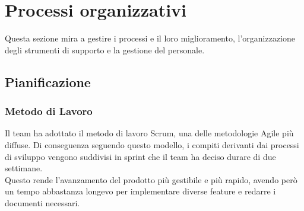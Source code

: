 \section{Processi organizzativi}
Questa sezione mira a gestire i processi e il loro miglioramento, l'organizzazione degli strumenti
di supporto e la gestione del personale.

    \subsection{Pianificazione}
        \subsubsection{Metodo di Lavoro}
        Il team ha adottato il metodo di lavoro Scrum, una delle metodologie Agile più diffuse.
        Di conseguenza seguendo questo modello, i compiti derivanti dai processi di sviluppo vengono suddivisi in sprint che il team ha deciso
        durare di due settimane.\\
        Questo rende l'avanzamento del prodotto più gestibile e più rapido, avendo però un tempo abbastanza longevo per implementare diverse
        feature e redarre i documenti necessari.
